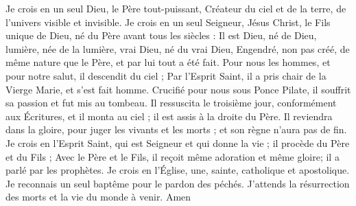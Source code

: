 Je crois en un seul Dieu, le Père tout-puissant, Créateur du ciel et de la terre, de l'univers visible et invisible. Je crois en un seul Seigneur, Jésus Christ, le Fils unique de Dieu, né du Père avant tous les siècles : Il est Dieu, né de Dieu, lumière, née de la lumière, vrai Dieu, né du vrai Dieu, Engendré, non pas créé, de même nature que le Père, et par lui tout a été fait. Pour nous les hommes, et pour notre salut, il descendit du ciel ; Par l'Esprit Saint, il a pris chair de la Vierge Marie, et s'est fait homme. Crucifié pour nous sous Ponce Pilate, il souffrit sa passion et fut mis au tombeau. Il ressuscita le troisième jour, conformément aux Écritures, et il monta au ciel ; il est assis à la droite du Père. Il reviendra dans la gloire, pour juger les vivants et les morts ; et son règne n'aura pas de fin. Je crois en l'Esprit Saint, qui est Seigneur et qui donne la vie ; il procède du Père et du Fils ; Avec le Père et le Fils, il reçoit même adoration et même gloire; il a parlé par les prophètes. Je crois en l'Église, une, sainte, catholique et apostolique. Je reconnais un seul baptême pour le pardon des péchés. J'attends la résurrection des morts et la vie du monde à venir. Amen
